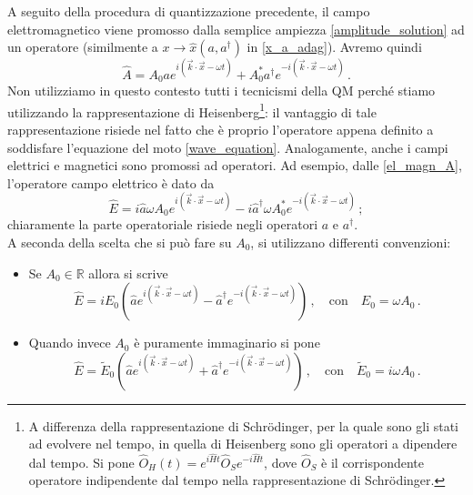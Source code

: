 \noindent A seguito della procedura di quantizzazione precedente, il campo elettromagnetico viene promosso dalla semplice ampiezza \eqref{amplitude_solution} ad un operatore (similmente a $x \to \hat{x}(a,a^\dag)$ in \eqref{x_a_adag}). Avremo quindi
\begin{equation*}
    \hat{A} = A_0 a e^{i \left( \vec{k} \cdot \vec{x} - \omega t \right)} + A_0^\ast a^\dag e^{-i \left( \vec{k} \cdot \vec{x} - \omega t \right)} \, .
\end{equation*}
Non utilizziamo in questo contesto tutti i tecnicismi della QM perché stiamo utilizzando la rappresentazione di Heisenberg\footnote{A differenza della rappresentazione di Schr\"odinger, per la quale sono gli stati ad evolvere nel tempo, in quella di Heisenberg sono gli operatori a dipendere dal tempo. Si pone $\hat{O}_H(t) = e^{i \hat{H} t} \hat{O}_S e^{-i \hat{H} t}$, dove $\hat{O}_S$ è il corrispondente operatore indipendente dal tempo nella rappresentazione di Schr\"odinger.}: il vantaggio di tale rappresentazione risiede nel fatto che è proprio l'operatore appena definito a soddisfare l'equazione del moto \eqref{wave_equation}. Analogamente, anche i campi elettrici e magnetici sono promossi ad operatori. Ad esempio, dalle \eqref{el_magn_A}, l'operatore campo elettrico è dato da
\begin{equation*}
    \hat{E} = i \hat{a} \omega A_0 e^{i \left( \vec{k} \cdot \vec{x} - \omega t \right)} - i \hat{a}^\dag \omega A_0^\ast e^{-i \left( \vec{k} \cdot \vec{x} - \omega t \right)} \, ;
\end{equation*}
chiaramente la parte operatoriale risiede negli operatori $a$ e $a^\dag$.\\
A seconda della scelta che si può fare su $A_0$, si utilizzano differenti convenzioni:
\begin{itemize}
    \item Se $A_0 \in \mathbb{R}$ allora si scrive
    \begin{equation*}
        \hat{E} = i E_0 \left( \hat{a} e^{i \left( \vec{k} \cdot \vec{x} - \omega t \right)} - \hat{a}^\dag e^{-i \left( \vec{k} \cdot \vec{x} - \omega t \right)} \right) \, , \quad \text{con} \quad E_0 = \omega A_0 \, .
    \end{equation*}
    \item Quando invece $A_0$ è puramente immaginario si pone
    \begin{equation*}
        \hat{E} =  \tilde{E}_0 \left( \hat{a} e^{i \left( \vec{k} \cdot \vec{x} - \omega t \right)} + \hat{a}^\dag e^{-i \left( \vec{k} \cdot \vec{x} - \omega t \right)} \right) \, , \quad \text{con} \quad \tilde{E}_0 = i \omega A_0 \, .
    \end{equation*}
\end{itemize}


